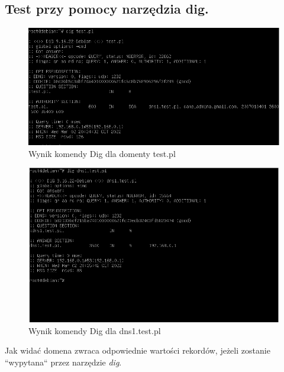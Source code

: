 \documentclass[12pt, a4paper]{article}
\begin{document}
    \subsection{Test przy pomocy narzędzia dig.}
        \begin{figure}[!h]
            \centering
            \includegraphics[width=\textwidth]{dig1.PNG}
            \caption{Wynik komendy Dig dla domenty test.pl}
            \label{fig:dig1}
        \end{figure}
        \begin{figure}[!h]
            \centering
            \includegraphics[width=\textwidth]{dig2.PNG}
            \caption{Wynik komendy Dig dla dns1.test.pl}
            \label{fig:dig2}
        \end{figure}
        Jak widać domena zwraca odpowiednie wartości rekordów, jeżeli zostanie ``wypytana`` przez narzędzie \textit{dig}. 
\end{document}

